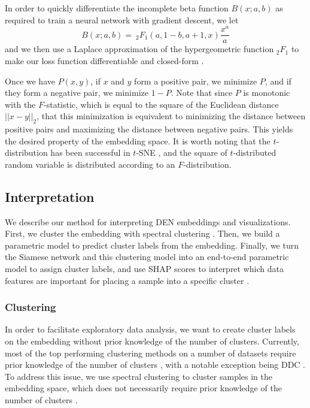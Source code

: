 \documentclass{article}
\begin{document}
In order to quickly differentiate the incomplete beta function $B(x; a, b)$ as required to train a neural network with gradient descent, we let 
    \[ B(x; a, b) =\ _2F_1(a, 1-b, a+1, x) \frac{x^a}{a} \]  
and we then use a Laplace approximation of the hypergeometric function $_2F_1$ to make our loss function differentiable and closed-form \cite{butler2002laplace}.

Once we have $P(x, y)$, if $x$ and $y$ form a positive pair, we minimize $P$, and if they form a negative pair, we minimize $1-P$. Note that since $P$ is monotonic with the $F$-statistic, which is equal to the square of the Euclidean distance $||x-y||_2$, that this minimization is equivalent to minimizing the distance between positive pairs and maximizing the distance between negative pairs. This yields the desired property of the embedding space. It is worth noting that the $t$-distribution has been successful in $t$-SNE \cite{maaten2008visualizing}, and the square of $t$-distributed random variable is distributed according to an $F$-distribution.













\subsection{Interpretation}

We describe our method for interpreting DEN embeddings and visualizations. First, we cluster the embedding with spectral clustering \cite{von2007tutorial}. Then, we build a parametric model to predict cluster labels from the embedding. Finally, we turn the Siamese network and this clustering model into an end-to-end parametric model to assign cluster labels, and use SHAP scores to interpret which data features are important for placing a sample into a specific cluster \cite{NIPS2017_7062}.

\subsubsection{Clustering}

In order to facilitate exploratory data analysis, we want to create cluster labels on the embedding without prior knowledge of the number of clusters. Currently, most of the top performing clustering methods on a number of datasets require prior knowledge of the number of clusters \cite{mcconville2019n2d, mrabah2019deep, shaham2018spectralnet, mukherjee2019clustergan}, with a notable exception being DDC \cite{ren2020deep}. To address this issue, we use spectral clustering to cluster samples in the embedding space, which does not necessarily require prior knowledge of the number of clusters \cite{von2007tutorial}.
\end{document}
